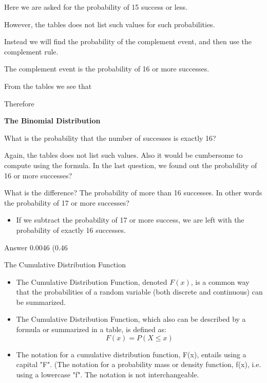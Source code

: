 \documentclass[]{report}
\begin{document}
Here we are asked for the probability of 15 success or less.


However, the tables does not list such values for such probabilities.

Instead we will find the probability of the complement event, and then use the complement rule.

The complement event is the probability of 16 or more successes.


From the tables we see that  

Therefore  



\textbf{The Binomial Distribution}




What is the probability that the number of successes is exactly 16?


Again, the tables does not list such values. Also it would be cumbersome to compute using the formula.
In the last question, we found out the probability of 16 or more successes?

What is the difference? The probability of more than 16 successes.
In other words the probability of  17 or more successes?


\begin{itemize}
\item If we subtract the probability of 17 or more success, we are left with the probability of exactly 16 successes.
\end{itemize}

Answer 0.0046        (0.46%








{The Cumulative Distribution Function}
\begin{itemize}
\item The Cumulative Distribution Function, denoted $F(x)$, is a common way that the probabilities
of a random variable (both discrete and continuous) can be summarized.
\item The Cumulative Distribution Function, which also can be
described by a formula or summarized in a table, is defined as:
\[F(x) = P(X \leq x) \]
\item The notation for a cumulative distribution function, F(x), entails using a capital
"F".  (The notation for a probability mass or density function, f(x), i.e. using a lowercase "f". The notation is not interchangeable.
\end{itemize}
\end{document}
